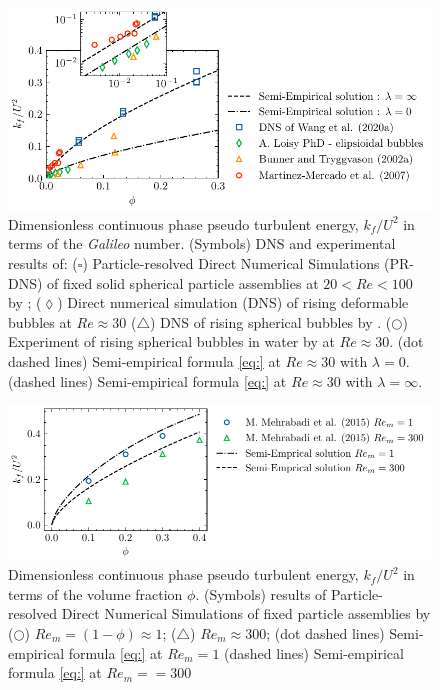 \begin{figure}
    \centering
    \includegraphics[height = 0.35\textwidth]{image/HOMOGENEOUS_final/CA/KFliterature.pdf}
    \caption{Dimensionless continuous phase pseudo turbulent energy, $k_f/U^2$ in terms of the \textit{Galileo} number.
    (Symbols) DNS and experimental results of: 
    ($\pmb\square$)  Particle-resolved Direct Numerical Simulations (PR-DNS)
    of fixed solid spherical particle assemblies at $20< Re < 100$  by \citet{wang2021numerical}; 
    ($\pmb\lozenge$) Direct numerical simulation (DNS) of rising deformable bubbles at $Re \approx 30$ \citep{loisy2016direct}
    ($\pmb\triangle$) DNS of rising spherical bubbles by \citet{bunner2002dynamics}. 
    ($\pmb\bigcirc$) Experiment of rising spherical bubbles in water by \citet{martinez2007measurement} at $Re \approx 30$. 
    (dot dashed lines) Semi-empirical formula \ref{eq:} at $Re \approx 30$ with $\lambda = 0$. 
    (dashed lines)  Semi-empirical formula \ref{eq:} at $Re \approx 30$ with $\lambda = \infty$.
    }
    \label{fig:trygvason}
\end{figure}
\begin{figure}
    \centering
    \includegraphics[height = 0.25\textwidth]{image/HOMOGENEOUS_final/CA/tenneti.pdf}
    \caption{Dimensionless continuous phase pseudo turbulent energy, $k_f/U^2$ in terms of the volume fraction $\phi$.
    (Symbols) 
    results of Particle-resolved Direct Numerical Simulations
    of fixed particle assemblies by \citet{mehrabadi2015pseudo}
    ($\pmb\bigcirc$) $Re_m = (1-\phi) \approx 1$; ($\pmb\triangle$) $Re_m \approx 300$;
    (dot dashed lines) Semi-empirical formula \ref{eq:} at $Re_m = 1$
    (dashed lines) Semi-empirical formula \ref{eq:} at $Re_m= = 300$
    }
    \label{fig:tennet}
\end{figure}
